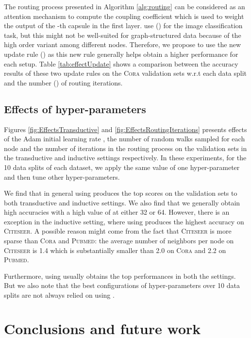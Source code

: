 \documentclass[sigconf]{acmart}
\begin{document}
The routing process presented in Algorithm \ref{alg:routing} can be considered as an attention mechanism to compute the coupling coefficient  which is used to weight the output of the -th  capsule in the first layer.
\citet{sabour2017dynamic} use () for the image classification task, but this might not be well-suited for graph-structured data because of the high order variant among different nodes. 
Therefore, we propose to use the new update rule () as this new rule generally helps obtain a higher performance for each setup.
Table \ref{tab:effectUpdate} shows a comparison between the accuracy results of these two update rules on the \textsc{Cora} validation sets w.r.t each data split and the number  () of routing iterations.



\subsection{Effects of hyper-parameters}

Figures \ref{fig:EffectsTransductive}  and \ref{fig:EffectsRoutingIterations} presents effects of the Adam initial learning rate , the number  of random walks sampled for each node and the number  of iterations in the routing process on the validation sets in the transductive and inductive settings respectively. In these experiments, for the 10 data splits of each dataset, we apply the same value of one hyper-parameter and then tune other hyper-parameters.

We find that in general  using   produces the top scores on the validation sets to both transductive and inductive settings. We also find that we generally obtain high accuracies with a high value of  at either 32 or 64. However, there is an exception in the inductive setting,  where using  produces the highest accuracy  on \textsc{Citeseer}. A possible reason might come from the fact that \textsc{Citeseer} is more sparse than \textsc{Cora} and \textsc{Pubmed}: the average number of neighbors per node on \textsc{Citeseer} is 1.4 which is substantially smaller than 2.0 on \textsc{Cora}  and 2.2 on  \textsc{Pubmed}. 


Furthermore, using  usually obtains the top performances in both the settings.
But we also note that the best configurations of hyper-parameters over 10 data splits are not always relied on using .



\section{Conclusions and future work}
\label{sec:conclusion}
\end{document}
